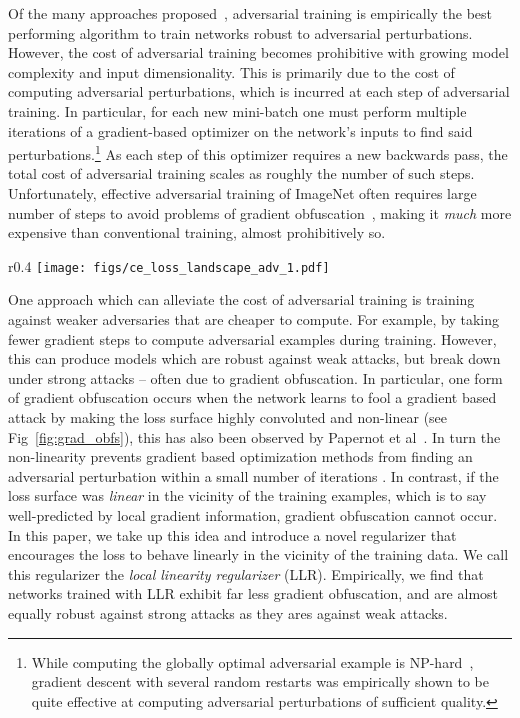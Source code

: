 \documentclass{article}
\theoremstyle{plain}
\theoremstyle{definition}
\theoremstyle{remark}
\begin{document}
Of the many approaches proposed~\citep{papernot2016distillation, buckman2018thermometer,dhillon2018stochastic,song2017pixeldefend, ma2018characterizing, moosavi2018robustness}, adversarial training \citep{kurakin2016adversarial, madry2017towards} is empirically the best performing algorithm to train networks robust to adversarial perturbations. However, the cost of adversarial training becomes prohibitive with growing model complexity and input dimensionality. This is primarily due to the cost of computing adversarial perturbations, which is incurred at each step of adversarial training. In particular, for each new mini-batch one must perform multiple iterations of a gradient-based optimizer on the network's inputs to find said perturbations.\footnote{While computing the globally optimal adversarial example is NP-hard~\citep{katz2017reluplex}, gradient descent with several random restarts was empirically shown to be quite effective at computing adversarial perturbations of sufficient quality.}  As each step of this optimizer requires a new backwards pass, the total cost of adversarial training scales as roughly the number of such steps. Unfortunately, effective adversarial training of ImageNet often requires large number of steps to avoid problems of gradient obfuscation~\cite{athalye2018obfuscated, uesato2018adversarial}, making it \emph{much} more expensive than conventional training, almost prohibitively so.


\begin{wrapfigure}{r}{0.4\textwidth}
    \centering
    \texttt{[image: figs/ce\_loss\_landscape\_adv\_1.pdf]}
    \caption{\small{Example of gradient obfuscated surface.}}
    \label{fig:grad_obfs}
\end{wrapfigure}
One approach which can alleviate the cost of adversarial training is training against weaker adversaries that are cheaper to compute. For example, by taking fewer gradient steps to compute adversarial examples during training. However, this can produce models which are robust against weak attacks, but break down under strong attacks -- often due to gradient obfuscation. In particular, one form of gradient obfuscation occurs when the network learns to fool a gradient based attack by making the loss surface highly convoluted and non-linear (see Fig~\ref{fig:grad_obfs}), this has also been observed by Papernot et al~\citep{papernot2017practical}. In turn the non-linearity prevents gradient based optimization methods from finding an adversarial perturbation within a small number of iterations \citep{carlini2017towards,uesato2018adversarial}. In contrast, if the loss surface was \emph{linear} in the vicinity of the training examples, which is to say well-predicted by local gradient information, gradient obfuscation cannot occur. In this paper, we take up this idea and introduce a novel regularizer that encourages the loss to behave linearly in the vicinity of the training data. We call this regularizer the \textit{local linearity regularizer} (LLR).
Empirically, we find that networks trained with LLR exhibit far less gradient obfuscation, and are almost equally robust against strong attacks as they ares against weak attacks. 
\end{document}
